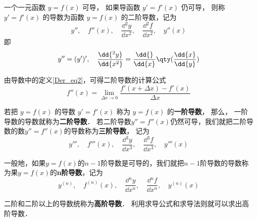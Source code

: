 

一个一元函数 $y=f(x)$ 可导， 如果导函数 $y'=f'(x)$ 仍可导， 则称 $y'=f'(x)$ 的导数为函数 $y=f(x)$ 的二阶导数，记为
\begin{equation}
y'',\quad f''(x),\quad \frac{\dd{^2y}}{\dd{x^2}},\quad \frac{\dd{^2f}}{\dd{x^2}},\quad y''(x)
\end{equation}
即
\begin{equation}
y''=(y')',\quad\frac{\dd{^2y}}{\dd{x^2}}=\frac{\dd{ }}{\dd{x}}\qty(\frac{\dd{x}}{\dd{y}})
\end{equation}

由导数中的定义\autoref{Der_eq2}，可得二阶导数的计算公式
\begin{equation}
f''(x)=\lim_{\Delta x \to 0} \frac{f'(x+ \Delta x)-f'(x)}{\Delta x}
\end{equation}

若把 $y=f(x)$ 的导数 $y'=f'(x)$ 称为 $y=f(x)$ 的\textbf{一阶导数}， 那么， 一阶导数的导数就称为\textbf{二阶导数}． 若二阶导数$y''=f''(x)$仍然可导，我们就把二阶导数的数$y''=f''(x)$的导数称为\textbf{三阶导数}， 记为
\begin{equation}
y''',\quad f'''(x),\quad \frac{\dd{^3y}}{\dd{x^3}},\quad \frac{\dd{^3f}}{\dd{x^3}},\quad y'''(x)
\end{equation}

一般地，如果$y=f(x)$的$n-1$阶导数是可导的，我们就把$n-1$阶导数的导数称为果$y=f(x)$的\textbf{n阶导数}，记为
\begin{equation}
y^{(n)},\quad f^{(n)}(x),\quad \frac{\dd{^ny}}{\dd{x^n}},\quad \frac{\dd{^nf}}{\dd{x^n}},\quad y^{(n)}(x)
\end{equation}

二阶和二阶以上的导数统称为\textbf{高阶导数}． 利用求导公式和求导法则就可以求出高阶导数．
